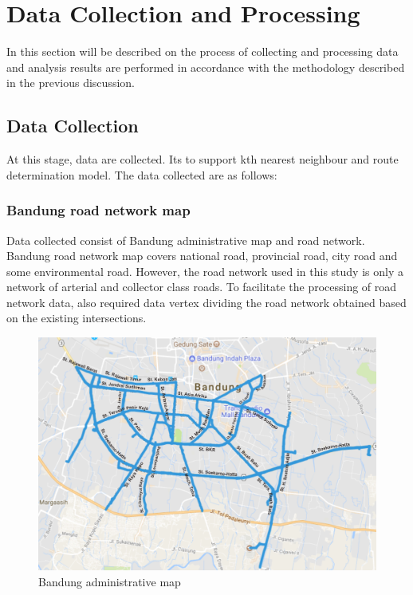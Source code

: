 
\chapter{Data Collection and Processing}
In this section will be described on the process of collecting and processing data and analysis results are performed in accordance with the methodology described in the previous discussion.

\section{Data Collection}
At this stage, data are collected. Its to support kth nearest neighbour and route determination model. The data collected are as follows:

\subsection{Bandung road network map}
Data collected consist of Bandung administrative map and road network. Bandung road network map covers national road, provincial road, city road and some environmental road. However, the road network used in this study is only a network of arterial and collector class roads. To facilitate the processing of road network data, also required data vertex dividing the road network obtained based on the existing intersections.

\begin{figure}[H]
    \centering
    \includegraphics[scale=0.42]{data_coll1.png}
    \caption{Bandung administrative map}
    \label{fig:bandung_administrativ_map}
\end{figure}

